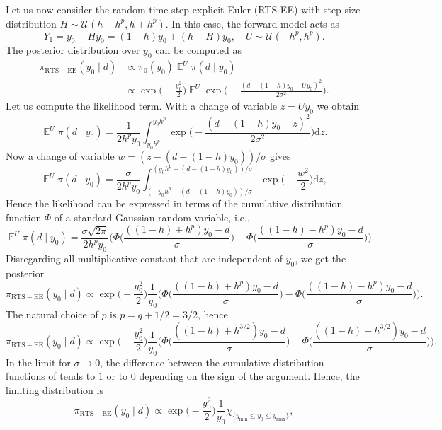 \documentclass{siamart1116}
\numberwithin{theorem}{section}
\newcommand{\E}{\operatorname{\mathbb{E}}}
\newcommand{\dd}{\mathrm{d}}
\begin{document}
Let us now consider the random time step explicit Euler (RTS-EE) with step size distribution $H \sim \mathcal U(h - h^p, h + h^p)$. In this case, the forward model acts as
\[
	Y_1 = y_0 - H y_0 = (1 - h)y_0 + (h - H) y_0, \quad U \sim \mathcal U (-h^p, h^p).
\]
The posterior distribution over $y_0$ can be computed as
\begin{align*}
	\pi_{\mathrm{RTS-EE}}(y_0 \mid d) &\propto \pi_0(y_0) \E^U\pi(d \mid y_0) \\
	&\propto \exp\Big(-\frac{y_0^2}{2}\Big) \E^U \exp\Big(-\frac{(d - (1 - h)y_0 - Uy_0)^2}{2\sigma^2}\Big).
\end{align*}
Let us compute the likelihood term. With a change of variable $z = Uy_0$ we obtain
\begin{equation*}
	\E^U\pi(d \mid y_0) = \frac{1}{2h^p y_0}\int_{y_0 h^p}^{y_0 h^p} \exp\Big(-\frac{(d - (1 - h)y_0 - z)^2}{2\sigma^2}\Big) \dd z.
\end{equation*}
Now a change of variable $w = (z - (d - (1 - h)y_0)) / \sigma$ gives
\begin{equation*}
	\E^U\pi(d \mid y_0) = \frac{\sigma}{2h^p y_0}\int_{(-y_0 h^p - (d - (1 - h)y_0)) / \sigma}^{(y_0 h^p - (d - (1 - h)y_0)) / \sigma} \exp\Big(-\frac{w^2}{2}\Big) \dd z,
\end{equation*}
Hence the likelihood can be expressed in terms of the cumulative distribution function $\Phi$ of a standard Gaussian random variable, i.e.,
\begin{equation*}
	\E^U\pi(d \mid y_0) = \frac{\sigma\sqrt{2\pi}}{2h^p y_0} \Big(\Phi\Big(\frac{((1 - h) + h^p)y_0 - d}{\sigma}\Big) - \Phi\Big(\frac{((1 - h) - h^p)y_0 - d}{\sigma}\Big) \Big).
\end{equation*}
Disregarding all multiplicative constant that are independent of $y_0$, we get the posterior
\[
	\pi_{\mathrm{RTS-EE}}(y_0 \mid d) \propto \exp\Big(-\frac{y_0^2}{2}\Big) \frac{1}{y_0} \Big(\Phi\Big(\frac{((1 - h) + h^p)y_0 - d}{\sigma}\Big) - \Phi\Big(\frac{((1 - h) - h^p)y_0 - d}{\sigma}\Big) \Big).
\]
The natural choice of $p$ is $p = q + 1/2 = 3/2$, hence
\[
	\pi_{\mathrm{RTS-EE}}(y_0 \mid d) \propto \exp\Big(-\frac{y_0^2}{2}\Big) \frac{1}{y_0} \Big(\Phi\Big(\frac{((1 - h) + h^{3/2})y_0 - d}{\sigma}\Big) - \Phi\Big(\frac{((1 - h) - h^{3/2})y_0 - d}{\sigma}\Big) \Big).
\]
In the limit for $\sigma \to 0$, the difference between the cumulative distribution functions of tends to $1$ or to $0$ depending on the sign of the argument. Hence, the limiting distribution is
\[
	\pi_{\mathrm{RTS-EE}}(y_0 \mid d) \propto \exp\Big(-\frac{y_0^2}{2}\Big)\frac{1}{y_0} \chi_{\{y_{\min} \leq y_0 \leq y_{\max}\}},
\]
\end{document}
